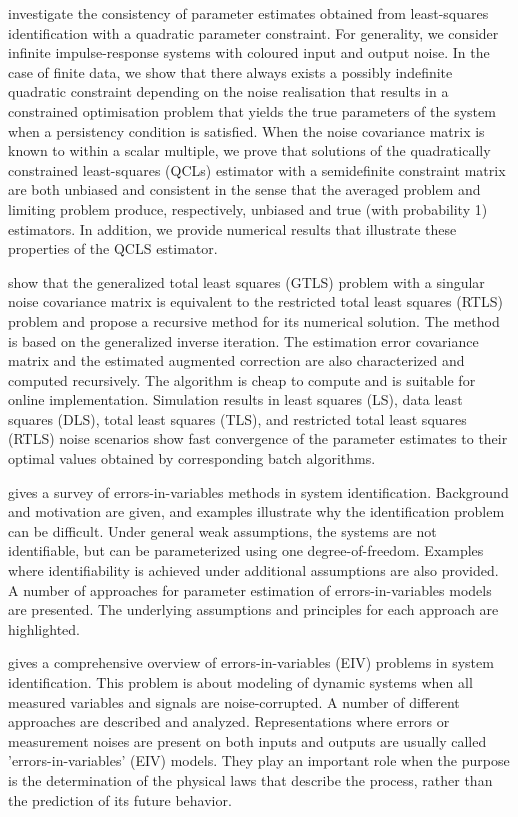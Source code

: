 \documentclass[11pt]{article}
\begin{document}
\citet{Palanthandalam10parameter}  investigate the consistency of parameter estimates obtained from least-squares identification with a quadratic parameter constraint. For generality, we consider infinite impulse-response systems with coloured input and output noise. In the case of finite data, we show that there always exists a possibly indefinite quadratic constraint depending on the noise realisation that results in a constrained optimisation problem that yields the true parameters of the system when a persistency condition is satisfied. When the noise covariance matrix is known to within a scalar multiple, we prove that solutions of the quadratically constrained least-squares (QCLs) estimator with a semidefinite constraint matrix are both unbiased and consistent in the sense that the averaged problem and limiting problem produce, respectively, unbiased and true (with probability 1) estimators. In addition, we provide numerical results that illustrate these properties of the QCLS estimator.

\citet{Rhode14recursive} show that the generalized total least squares (GTLS) problem with a singular noise covariance matrix is equivalent to the restricted total least squares (RTLS) problem and propose a recursive method for its numerical solution. The method is based on the generalized inverse iteration. The estimation error covariance matrix and the estimated augmented correction are also characterized and computed recursively. The algorithm is cheap to compute and is suitable for online implementation. Simulation results in least squares (LS), data least squares (DLS), total least squares (TLS), and restricted total least squares (RTLS) noise scenarios show fast convergence of the parameter estimates to their optimal values obtained by corresponding batch algorithms.

\citet{Soderstrom07} gives a survey of errors-in-variables methods in system identification. Background and motivation are given, and examples illustrate why the identification problem can be difficult. Under general weak assumptions, the systems are not identifiable, but can be parameterized using one degree-of-freedom. Examples where identifiability is achieved under additional assumptions are also provided. A number of approaches for parameter estimation of errors-in-variables models are presented. The underlying assumptions and principles for each approach are highlighted.

\citet{Soderstrom18} gives a comprehensive overview of errors-in-variables (EIV) problems in system identification. This problem is about modeling of dynamic systems when all measured variables and signals are noise-corrupted. A number of different approaches are described and analyzed. Representations where errors or measurement noises are present on both inputs and outputs are usually called 'errors-in-variables' (EIV) models. They play an important role when the purpose is the determination of the physical laws that describe the process, rather than the prediction of its future behavior.
\end{document}
